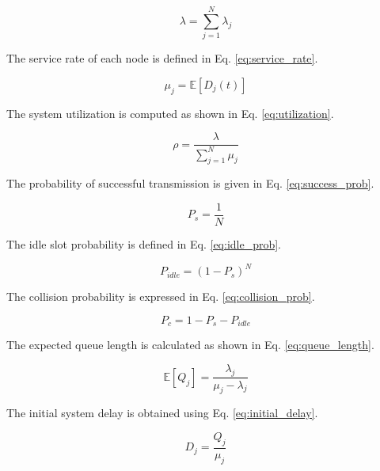 \documentclass[a4paper,fleqn]{cas-dc}
\numberwithin{equation}{section}
\begin{document}
\begin{equation}
\lambda = \sum_{j=1}^{N} \lambda_j
\label{eq:total_arrival}
\end{equation}

The service rate of each node is defined in Eq. \ref{eq:service_rate}.

\begin{equation}
\mu_j = \mathbb{E}[D_j(t)]
\label{eq:service_rate}
\end{equation}

The system utilization is computed as shown in Eq. \ref{eq:utilization}.

\begin{equation}
\rho = \frac{\lambda}{\sum_{j=1}^{N} \mu_j}
\label{eq:utilization}
\end{equation}

The probability of successful transmission is given in Eq. \ref{eq:success_prob}.

\begin{equation}
P_s = \frac{1}{N}
\label{eq:success_prob}
\end{equation}

The idle slot probability is defined in Eq. \ref{eq:idle_prob}.

\begin{equation}
P_{idle} = (1 - P_s)^N
\label{eq:idle_prob}
\end{equation}

The collision probability is expressed in Eq. \ref{eq:collision_prob}.

\begin{equation}
P_c = 1 - P_s - P_{idle}
\label{eq:collision_prob}
\end{equation}

The expected queue length is calculated as shown in Eq. \ref{eq:queue_length}.

\begin{equation}
\mathbb{E}[Q_j] = \frac{\lambda_j}{\mu_j - \lambda_j}
\label{eq:queue_length}
\end{equation}

The initial system delay is obtained using Eq. \ref{eq:initial_delay}.

\begin{equation}
D_j = \frac{Q_j}{\mu_j}
\label{eq:initial_delay}
\end{equation}
\end{document}
